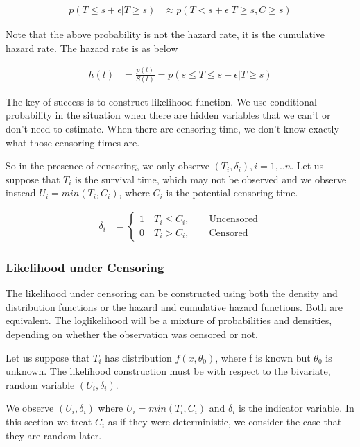 \documentclass[11pt]{article} %
\begin{document}
\begin{align*}
	p(T \leq s + \epsilon | T \geq s) & \approx p(T < s+ \epsilon | T \geq s, C \geq s)
\end{align*}

Note that the above probability is not the hazard rate, it is the cumulative hazard rate. The hazard rate is as below

\begin{align*}
	 h(t) & = \frac{p(t)}{S(t)} = p( s \leq T \leq s + \epsilon | T \geq s)
\end{align*}

The key of success is to construct likelihood function. We use conditional probability in the situation when there are hidden variables that we can't or don't need to estimate. When there are censoring time, we don't know exactly what those censoring times are.

So in the presence of censoring, we only observe $(T_i, \delta_i), i=1,..n$. Let us suppose that $T_i$ is the survival time, which may not be observed and we observe instead $U_i = min(T_i, C_i)$, where $C_i$ is the potential censoring time. 

\begin{align*}
	\delta_i & =
	\begin{cases}
		1 \quad T_i \leq C_i, \qquad \text{Uncensored}\\
		0 \quad  T_i > C_i, \qquad \text{Censored}
	\end{cases}
\end{align*}

\subsubsection{Likelihood under Censoring}
The likelihood under censoring can be constructed using both the density and distribution
functions or the hazard and cumulative hazard functions. Both are equivalent. The loglikelihood will be a mixture of probabilities and densities, depending on whether the
observation was censored or not. 

Let us suppose that $T_i$ has distribution $f(x, \theta_0)$, where f is known but $\theta_0$ is unknown. The likelihood construction must be with respect to the bivariate, random variable $(U_i, \delta_i)$.

We observe $(U_i, \delta_i)$ where $U_i = min(T_i, C_i)$ and $\delta_i$ is the
indicator variable. In this section we treat $C_i$ as if they were deterministic, we consider
the case that they are random later.
\end{document}
